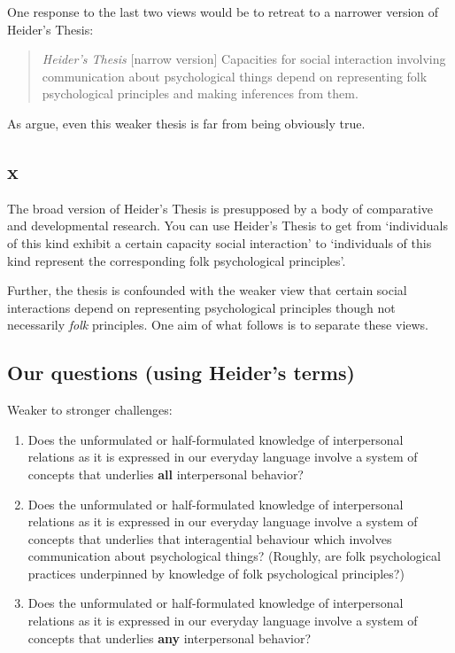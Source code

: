 \documentclass[12pt,\papersize]{extarticle}
\begin{document}
One response to the last two views would be to retreat to a narrower version of Heider's Thesis:

\begin{quote}
\emph{Heider's Thesis} {[}narrow version{]} Capacities for social interaction involving communication about psychological things depend on representing folk psychological principles and making inferences from them.
\end{quote}

As \citet{stich:1994_whata} argue, even this weaker thesis is far from being obviously true.

\hypertarget{x}{%
\subsection{x}\label{x}}

The broad version of Heider's Thesis is presupposed by a body of comparative and developmental research. You can use Heider's Thesis to get from `individuals of this kind exhibit a certain capacity social interaction' to `individuals of this kind represent the corresponding folk psychological principles'.

Further, the thesis is confounded with the weaker view that certain social interactions depend on representing psychological principles though not necessarily \emph{folk} principles. One aim of what follows is to separate these views.

\hypertarget{our-questions-using-heiders-terms}{%
\subsection{Our questions (using Heider's terms)}\label{our-questions-using-heiders-terms}}

Weaker to stronger challenges:

\begin{enumerate}
\def\labelenumi{\arabic{enumi}.}
\item
  Does the unformulated or half-formulated knowledge of interpersonal relations as it is expressed in our everyday language involve a system of concepts that underlies \textbf{all} interpersonal behavior?
\item
  Does the unformulated or half-formulated knowledge of interpersonal relations as it is expressed in our everyday language involve a system of concepts that underlies that interagential behaviour which involves communication about psychological things? (Roughly, are folk psychological practices underpinned by knowledge of folk psychological principles?)
\item
  Does the unformulated or half-formulated knowledge of interpersonal relations as it is expressed in our everyday language involve a system of concepts that underlies \textbf{any} interpersonal behavior?
\end{enumerate}
\end{document}
